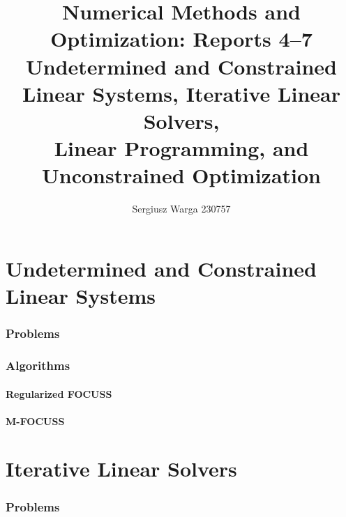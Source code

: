 \documentclass[a4paper]{article}
\title{%
  {\LARGE Numerical Methods and Optimization: Reports 4--7}\\[0.4em]
  {\large Undetermined and Constrained Linear Systems,
    Iterative Linear Solvers,\\
    Linear Programming, and Unconstrained Optimization}%
}
\author{Sergiusz Warga 230757}
\date{}
\newcommand{\labbase}{}
\let\OrigLstInputListing
\renewcommand{}[2][]{\OrigLstInputListing[#1]{\labbase#2}}
\begin{document}
\maketitle
\tableofcontents
\pagebreak

\part{Undetermined and Constrained Linear Systems}

\renewcommand{\labbase}{lab4/}

\section{Problems}



\clearpage

\section{Algorithms}
\subsection{Regularized FOCUSS}%
\label{algorithm:focuss}


\subsection{M-FOCUSS}%
\label{algorithm:mfocuss}


\part{Iterative Linear Solvers}

\renewcommand{\labbase}{lab5/}

\section{Problems}



\clearpage
\end{document}
